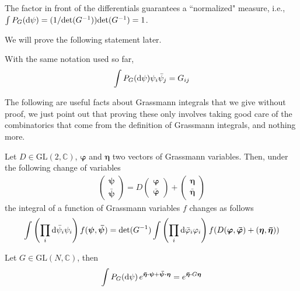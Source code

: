 \begin{remark}
	The factor in front of the differentials guarantees a ``normalized" measure, i.e.,\\
	$\int P_G(\mathrm{d}\psi) = (1/\mathrm{det}(G^{-1})) \mathrm{det}(G^{-1}) = 1$.
\end{remark}

We will prove the following statement later.

\begin{lemma}
	\label{lemma:grassmann-propagator}
	With the same notation used so far,
	\begin{align*}
		\int P_G(\mathrm{d}\psi) \psi_i \bar\psi_j = G_{ij}
	\end{align*}
\end{lemma}

The following are useful facts about Grassmann integrals that we give without proof, we just
point out that proving these only involves taking good care of the combinatorics that come
from the definition of Grassmann integrals, and nothing more.

\begin{lemma}
	Let $D \in \mathrm{GL(2,\mathbb{C})}$, $\boldsymbol{\varphi}$ and $\boldsymbol{\eta}$
	two vectors of Grassmann variables. Then, under the following change of variables
	\begin{align*}
		\begin{pmatrix} \boldsymbol{\psi} \\ \boldsymbol{\bar\psi} \end{pmatrix}
		= D \begin{pmatrix} \boldsymbol{\varphi} \\ \boldsymbol{\bar\varphi} \end{pmatrix}
		+ \begin{pmatrix} \boldsymbol{\eta} \\ \boldsymbol{\bar\eta} \end{pmatrix}
	\end{align*}
	the integral of a function of Grassmann variables $f$ changes as follows
	\begin{align*}
		\int \left( \prod_{i} \mathrm{d}\bar\psi_i \psi_i \right) f(\boldsymbol{\psi},\boldsymbol{\bar\psi})
	= \mathrm{det}(G^{-1}) \int \left( \prod_{i} \mathrm{d}\bar\varphi_i \varphi_i \right) f(D(\boldsymbol{\varphi},\boldsymbol{\bar\varphi})+(\boldsymbol{\eta},\boldsymbol{\bar\eta}))
	\end{align*}
\end{lemma}

\begin{lemma}
	Let $G \in \mathrm{GL}(N,\mathbb{C})$, then
	\begin{align*}
		\int P_G(\mathrm{d}\psi)\,e^{\boldsymbol{\bar\eta \cdot \psi} + \boldsymbol{\bar\psi \cdot \eta}}
			= e^{\boldsymbol{\bar\eta \cdot} G \boldsymbol{\eta}}
	\end{align*}
\end{lemma}

